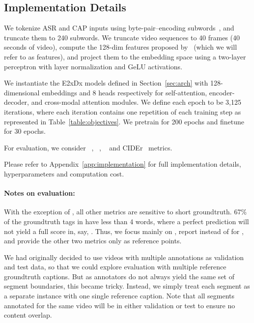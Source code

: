 \documentclass[11pt,a4paper]{article}
\begin{document}
\subsection{Implementation Details }


We tokenize ASR and CAP inputs using byte-pair--encoding subwords~\citep{sennrich2015neural}, and truncate them to 240 subwords. We truncate video sequences to 40 frames (40 seconds of video), compute the 128-dim features proposed by~\citet{wang2014learning} (which we will refer to as \starburst features), and project them to the embedding space using a two-layer perceptron with layer normalization and GeLU activations. 

We instantiate the E2xDx models defined in Section~\ref{sec:arch} with 128-dimensional embeddings and 8 heads respectively for self-attention, encoder-decoder, and cross-modal attention modules. We define each epoch to be 3,125 iterations, where each iteration contains one repetition of each training step as represented in Table~\ref{table:objectives}. We pretrain for 200 epochs and finetune for 30 epochs.

For evaluation, we consider ~\citep{papineni2002bleu}, \meteor~\citep{denkowski2014meteor}, \rouge~\citep{lin2004automatic} and CIDEr~\citep{vedantam2015cider} metrics.

Please refer to Appendix~\ref{app:implementation} for full implementation details, hyperparameters and computation cost.



\paragraph{Notes on \ldvm evaluation:} With the exception of \rouge, all other metrics are sensitive to short groundtruth.  67\% of the groundtruth tags in \ldvm have less than 4 words, where a perfect prediction will not yield a full score in, say, .  Thus, we focus mainly on \rouge, report \mbox{} instead of  for \ldvm, and provide the other two metrics only as reference points.

We had originally decided to use videos with multiple annotations as validation and test data, so that we could explore evaluation with multiple reference groundtruth captions.  But as annotators do not always yield the same set of segment boundaries, this became tricky.  Instead, we simply treat each segment as a separate instance with one single reference caption.  Note that all segments annotated for the same video will be in either validation or test to ensure no content overlap.
\end{document}
